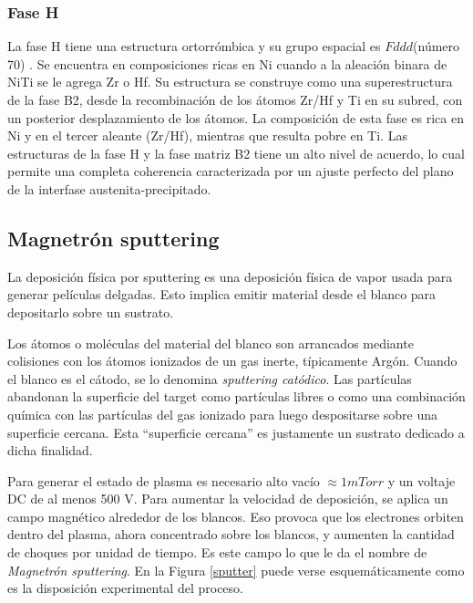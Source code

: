 \documentclass[12pt]{article}
\theoremstyle{definition}
\theoremstyle{remark}
\begin{document}
\subsubsection{Fase H}
La fase H tiene una estructura ortorrómbica y su grupo espacial es $Fddd$(número 70) \cite{Yang2013} \cite{Santamarta2013}. Se encuentra en composiciones ricas en Ni cuando a la aleación binara de NiTi se le agrega Zr o Hf. Su estructura se construye como una superestructura de la fase B2, desde la recombinación de los átomos Zr/Hf y Ti en su subred, con un posterior desplazamiento de los átomos\cite{Evirgen2018}. La composición de esta fase es rica en Ni y en el tercer aleante (Zr/Hf), mientras que resulta pobre en Ti. Las estructuras de la fase H y la fase matriz B2 tiene un alto nivel de acuerdo, lo cual permite una completa coherencia caracterizada por un ajuste perfecto del plano de la interfase austenita-precipitado\cite{Evirgen2018}.




\subsection{Magnetrón sputtering}
La deposición física por sputtering es una deposición física de vapor usada para generar películas delgadas. Esto implica emitir material desde el blanco para depositarlo sobre un sustrato. 

 Los átomos o moléculas del material del blanco son arrancados mediante colisiones con los átomos ionizados de un gas inerte, típicamente Argón. Cuando el blanco es el cátodo, se lo denomina \textit{sputtering catódico}. Las partículas abandonan la superficie del target como partículas libres o como una combinación química con las partículas del gas ionizado para luego despositarse sobre una superficie cercana.  Esta ``superficie cercana'' es justamente un sustrato dedicado a dicha finalidad.
 
Para generar el estado de plasma es necesario alto vacío $\approx 1 mTorr$ y un voltaje DC de al menos 500 V. Para aumentar la velocidad de deposición, se aplica un campo magnético alrededor de los blancos. Eso provoca que los electrones orbiten dentro del plasma, ahora concentrado sobre los blancos, y aumenten la cantidad de choques por unidad de tiempo. Es este campo lo que le da el nombre de \textit{Magnetrón sputtering}\citep{Malvasio}\citep{ThinFilm}. En la Figura \ref{sputter} puede verse esquemáticamente como es la disposición experimental del proceso.
\end{document}
